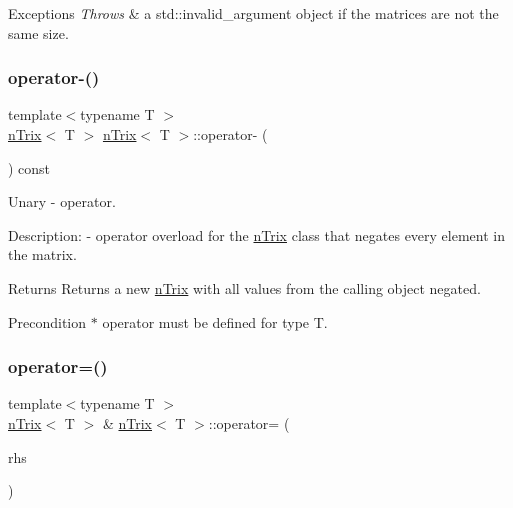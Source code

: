 \begin{DoxyExceptions}{Exceptions}
{\em Throws} & a std\+::invalid\+\_\+argument object if the matrices are not the same size. \\
\hline
\end{DoxyExceptions}
\mbox{\label{classnTrix_a23acc805ad0f69ca5f8195327ebdc3f2}} 
\subsubsection{\texorpdfstring{operator-\/()}{operator-()}\hspace{0.1cm}{\footnotesize\ttfamily [2/2]}}
{\footnotesize\ttfamily template$<$typename T $>$ \\
\hyperlink{classnTrix}{n\+Trix}$<$ T $>$ \hyperlink{classnTrix}{n\+Trix}$<$ T $>$\+::operator-\/ (\begin{DoxyParamCaption}{ }\end{DoxyParamCaption}) const}



Unary -\/ operator. 

Description\+: -\/ operator overload for the \hyperlink{classnTrix}{n\+Trix} class that negates every element in the matrix. \begin{DoxyReturn}{Returns}
Returns a new \hyperlink{classnTrix}{n\+Trix} with all values from the calling object negated. 
\end{DoxyReturn}
\begin{DoxyPrecond}{Precondition}
$\ast$ operator must be defined for type T. 
\end{DoxyPrecond}
\mbox{\label{classnTrix_a9003760685902f4e9f5759f826906641}} 
\subsubsection{\texorpdfstring{operator=()}{operator=()}}
{\footnotesize\ttfamily template$<$typename T $>$ \\
\hyperlink{classnTrix}{n\+Trix}$<$ T $>$ \& \hyperlink{classnTrix}{n\+Trix}$<$ T $>$\+::operator= (\begin{DoxyParamCaption}\item[{const \hyperlink{classnTrix}{n\+Trix}$<$ T $>$ \&}]{rhs }\end{DoxyParamCaption})}



